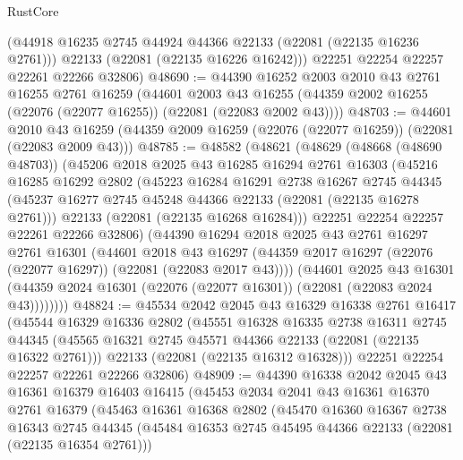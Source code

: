 \begin{lexlean}{RustCore}
\begin{coremodule}
        (@44918 @16235 @2745 @44924 @44366 @22133 (@22081 (@22135 @16236 @2761)))
        @22133
        (@22081 (@22135 @16226 @16242)))
      @22251
      @22254
      @22257
      @22261
      @22266
      @32806)
@48690 := @44390
    @16252
    @2003
    @2010
    @43
    @2761
    @16255
    @2761
    @16259
    (@44601
      @2003
      @43
      @16255
      (@44359 @2002 @16255 (@22076 (@22077 @16255)) (@22081 (@22083 @2002 @43))))
@48703 := @44601
    @2010
    @43
    @16259
    (@44359 @2009 @16259 (@22076 (@22077 @16259)) (@22081 (@22083 @2009 @43)))
@48785 := @48582
    (@48621
      (@48629
        (@48668 (@48690 @48703))
        (@45206
          @2018
          @2025
          @43
          @16285
          @16294
          @2761
          @16303
          (@45216
            @16285
            @16292
            @2802
            (@45223
              @16284
              @16291
              @2738
              @16267
              @2745
              @44345
              (@45237 @16277 @2745 @45248 @44366 @22133 (@22081 (@22135 @16278 @2761)))
              @22133
              (@22081 (@22135 @16268 @16284)))
            @22251
            @22254
            @22257
            @22261
            @22266
            @32806)
          (@44390
            @16294
            @2018
            @2025
            @43
            @2761
            @16297
            @2761
            @16301
            (@44601
              @2018
              @43
              @16297
              (@44359 @2017 @16297 (@22076 (@22077 @16297)) (@22081 (@22083 @2017 @43))))
            (@44601
              @2025
              @43
              @16301
              (@44359 @2024 @16301 (@22076 (@22077 @16301)) (@22081 (@22083 @2024 @43))))))))
@48824 := @45534
    @2042
    @2045
    @43
    @16329
    @16338
    @2761
    @16417
    (@45544
      @16329
      @16336
      @2802
      (@45551
        @16328
        @16335
        @2738
        @16311
        @2745
        @44345
        (@45565 @16321 @2745 @45571 @44366 @22133 (@22081 (@22135 @16322 @2761)))
        @22133
        (@22081 (@22135 @16312 @16328)))
      @22251
      @22254
      @22257
      @22261
      @22266
      @32806)
@48909 := @44390
    @16338
    @2042
    @2045
    @43
    @16361
    @16379
    @16403
    @16415
    (@45453
      @2034
      @2041
      @43
      @16361
      @16370
      @2761
      @16379
      (@45463
        @16361
        @16368
        @2802
        (@45470
          @16360
          @16367
          @2738
          @16343
          @2745
          @44345
          (@45484 @16353 @2745 @45495 @44366 @22133 (@22081 (@22135 @16354 @2761)))

\end{coremodule}
\end{lexlean}
